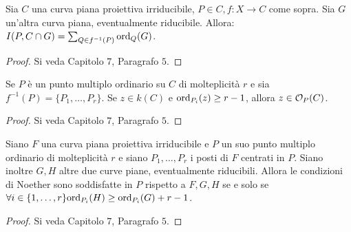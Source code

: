     \begin{proposizione}\label{prop:molt-int}
        Sia $C$ una curva piana proiettiva irriducibile, $P \in C, f : X \to C$ come sopra. Sia $G$ un'altra curva piana, eventualmente riducibile. Allora: $I(P,C \cap G) = \sum_{Q \in f^{-1}(P)}\text{ord}_Q(G)$.
    \end{proposizione}
    \begin{proof}
        Si veda \cite{fulton} Capitolo $7$, Paragrafo $5$.
    \end{proof}
    \begin{lemma}
        Se $P$ è un punto multiplo ordinario su $C$ di molteplicità $r$ e sia $f^{-1}(P) = \{P_1,\ldots,P_r\}$. Se $z \in k(C)$ e $\text{ord}_{P_i}(z) \geq r-1$, allora $z \in \mathcal{O}_P(C)$.
    \end{lemma}
    \begin{proof}
        Si veda \cite{fulton} Capitolo $7$, Paragrafo $5$.
    \end{proof}
    \begin{proposizione}\label{prop:n-c}
        Siano $F$ una curva piana proiettiva irriducibile e $P$ un suo punto multiplo ordinario di molteplicità $r$ e siano $P_1,\ldots,P_r$ i posti di $F$ centrati in $P$. Siano inoltre $G,H$ altre due curve piane, eventualmente riducibili. Allora le condizioni di Noether sono soddisfatte in $P$ rispetto a 
        $F,G,H$ se e solo se $\forall i \in \{1,\ldots,r\} \text{ord}_{P_i}(H) \geq \text{ord}_{P_i}(G) + r-1$.
    \end{proposizione}
    \begin{proof}
        Si veda \cite{fulton} Capitolo $7$, Paragrafo $5$.
    \end{proof}



































    









   